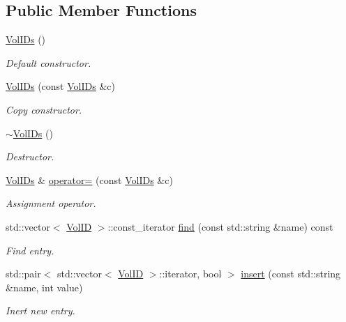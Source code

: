 \subsection*{Public Member Functions}
\begin{DoxyCompactItemize}
\item 
\hyperlink{class_d_d4hep_1_1_geometry_1_1_placed_volume_extension_1_1_vol_i_ds_a83ca12f7cd6c231504251ce741295f64}{Vol\+I\+Ds} ()
\begin{DoxyCompactList}\small\item\em Default constructor. \end{DoxyCompactList}\item 
\hyperlink{class_d_d4hep_1_1_geometry_1_1_placed_volume_extension_1_1_vol_i_ds_af8871280ae9f0c0381490086de225316}{Vol\+I\+Ds} (const \hyperlink{class_d_d4hep_1_1_geometry_1_1_placed_volume_extension_1_1_vol_i_ds}{Vol\+I\+Ds} \&c)
\begin{DoxyCompactList}\small\item\em Copy constructor. \end{DoxyCompactList}\item 
\hyperlink{class_d_d4hep_1_1_geometry_1_1_placed_volume_extension_1_1_vol_i_ds_ab42d6bd0b015ff8dec78a37c29b0a994}{$\sim$\+Vol\+I\+Ds} ()
\begin{DoxyCompactList}\small\item\em Destructor. \end{DoxyCompactList}\item 
\hyperlink{class_d_d4hep_1_1_geometry_1_1_placed_volume_extension_1_1_vol_i_ds}{Vol\+I\+Ds} \& \hyperlink{class_d_d4hep_1_1_geometry_1_1_placed_volume_extension_1_1_vol_i_ds_a92f2c199ac269cbe4654be12f268bb3d}{operator=} (const \hyperlink{class_d_d4hep_1_1_geometry_1_1_placed_volume_extension_1_1_vol_i_ds}{Vol\+I\+Ds} \&c)
\begin{DoxyCompactList}\small\item\em Assignment operator. \end{DoxyCompactList}\item 
std\+::vector$<$ \hyperlink{class_d_d4hep_1_1_geometry_1_1_placed_volume_extension_a9f0e95dedfbda206b118af985b2ed473}{Vol\+ID} $>$\+::const\+\_\+iterator \hyperlink{class_d_d4hep_1_1_geometry_1_1_placed_volume_extension_1_1_vol_i_ds_a858e0760f9968c77969014aa150c2933}{find} (const std\+::string \&name) const
\begin{DoxyCompactList}\small\item\em Find entry. \end{DoxyCompactList}\item 
std\+::pair$<$ std\+::vector$<$ \hyperlink{class_d_d4hep_1_1_geometry_1_1_placed_volume_extension_a9f0e95dedfbda206b118af985b2ed473}{Vol\+ID} $>$\+::iterator, bool $>$ \hyperlink{class_d_d4hep_1_1_geometry_1_1_placed_volume_extension_1_1_vol_i_ds_acb6b42eb167c3484c8991627d63245ba}{insert} (const std\+::string \&name, int value)
\begin{DoxyCompactList}\small\item\em Inert new entry. \end{DoxyCompactList}\end{DoxyCompactItemize}


